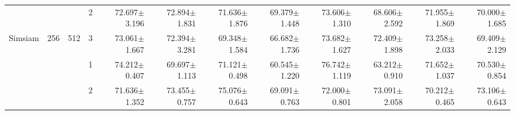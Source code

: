 \begin{table}[htpb]
{\begin{tabular}{c|c|c|c|rr|rr|rr|rr}
                                 &                                                                                 &                                                                                        & 2                                                                                         & 72.697$\pm$3.196                        & 72.894$\pm$1.831                        & 71.636$\pm$1.876                        & 69.379$\pm$1.448                        & 73.606$\pm$1.310                        & 68.606$\pm$2.592                        & 71.955$\pm$1.869                        & 70.000$\pm$1.685                       \\
\multirow{-12}{*}{Simsiam}       & \multirow{-6}{*}{256}                                                           & \multirow{-3}{*}{512}                                                                  & 3                                                                                         & 73.061$\pm$1.667                        & 72.394$\pm$3.281                        & 69.348$\pm$1.584                        & 66.682$\pm$1.736                        & 73.682$\pm$1.627                        & 72.409$\pm$1.898                        & 73.258$\pm$2.033                        & 69.409$\pm$2.129                       \\ \hline
                                 &                                                                                 &                                                                                        & 1                                                                                         & 74.212$\pm$0.407                        & 69.697$\pm$1.113                        & 71.121$\pm$0.498                        & 60.545$\pm$1.220                        & {\color[HTML]{FE0000} 76.742$\pm$1.119} & 63.212$\pm$0.910                        & 71.652$\pm$1.037                        & 70.530$\pm$0.854                       \\
                                 &                                                                                 &                                                                                        & 2                                                                                         & 71.636$\pm$1.352                        & 73.455$\pm$0.757                        & 75.076$\pm$0.643                        & 69.091$\pm$0.763                        & 72.000$\pm$0.801                        & 73.091$\pm$2.058                        & 70.212$\pm$0.465                        & 73.106$\pm$0.643                       \\

\end{tabular}}
\end{table}
